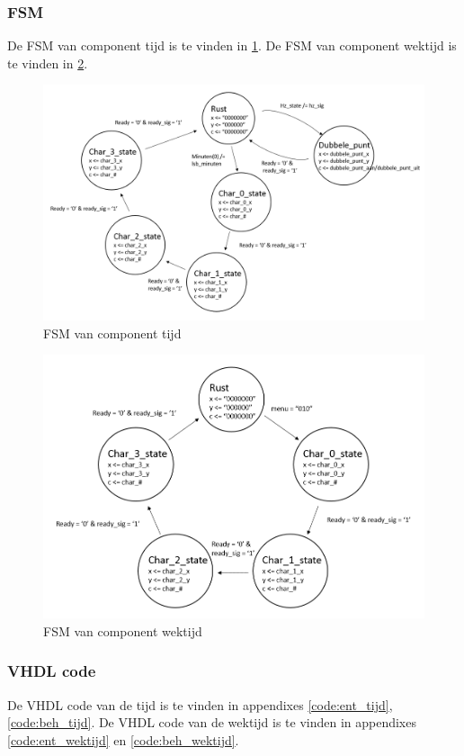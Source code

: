 \subsubsection{FSM}
De FSM van component tijd is te vinden in \ref{fig:fsm_tijd}. De FSM van component wektijd is te vinden in \ref{fig:fsm_wektijd}.
\begin{figure}[h!]
	\center
	\includegraphics[scale=0.5]{Figuren/LCD/fsm_tijd.png}
	\caption{FSM van component tijd}
	\label{fig:fsm_tijd}
\end{figure}
\begin{figure}[h!]
	\center
	\includegraphics[scale=0.6]{Figuren/LCD/fsm_wektijd.png}
	\caption{FSM van component wektijd}
	\label{fig:fsm_wektijd}
\end{figure}

\subsubsection{VHDL code}
De VHDL code van de tijd is te vinden in appendixes \ref{code:ent_tijd}, \ref{code:beh_tijd}. De VHDL code van de wektijd is te vinden in appendixes \ref{code:ent_wektijd} en \ref{code:beh_wektijd}.

